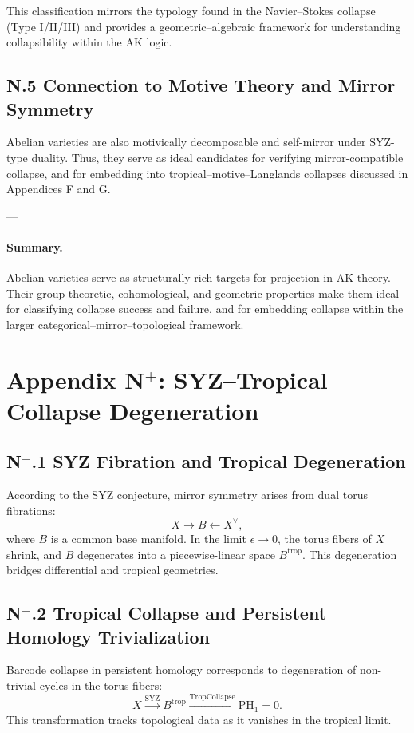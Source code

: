 \documentclass[11pt]{article}
\begin{document}
\begin{axiom}
\begin{axiom}
{{This classification mirrors the typology found in the Navier–Stokes collapse (Type I/II/III) and provides a geometric–algebraic framework for understanding collapsibility within the AK logic.

\subsection*{N.5 Connection to Motive Theory and Mirror Symmetry}

Abelian varieties are also motivically decomposable and self-mirror under SYZ-type duality.  
Thus, they serve as ideal candidates for verifying mirror-compatible collapse, and for embedding into tropical–motive–Langlands collapses discussed in Appendices F and G.

---

\paragraph{Summary.}

Abelian varieties serve as structurally rich targets for projection in AK theory.  
Their group-theoretic, cohomological, and geometric properties make them ideal for classifying collapse success and failure, and for embedding collapse within the larger categorical–mirror–topological framework.



\section*{Appendix N$^+$: SYZ–Tropical Collapse Degeneration}

\subsection*{N$^+$.1 SYZ Fibration and Tropical Degeneration}
According to the SYZ conjecture, mirror symmetry arises from dual torus fibrations:
\[
X \to B \leftarrow X^\vee,
\]
where \( B \) is a common base manifold. In the limit \( \epsilon \to 0 \), the torus fibers of \( X \) shrink, and \( B \) degenerates into a piecewise-linear space \( B^{\mathrm{trop}} \). This degeneration bridges differential and tropical geometries.

\subsection*{N$^+$.2 Tropical Collapse and Persistent Homology Trivialization}
Barcode collapse in persistent homology corresponds to degeneration of non-trivial cycles in the torus fibers:
\[
X \xrightarrow{\mathrm{SYZ}} B^{\mathrm{trop}} \xrightarrow{\mathrm{TropCollapse}} \mathrm{PH}_1 = 0.
\]
This transformation tracks topological data as it vanishes in the tropical limit.

}}
\end{axiom}
\end{axiom}
\end{document}
